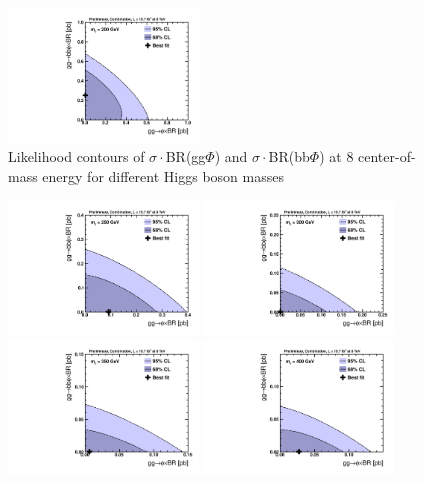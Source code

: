 \begin{figure}[!h]
\begin{center}
 \includegraphics[width=0.45\textwidth]{MSSM/PLOTS/cmb-ggH-bbH-scan-GGH-BBH-200.pdf}
 \caption{Likelihood contours of $\sigma\cdot$BR(gg$\Phi$) and $\sigma\cdot$BR(bb$\Phi$) at 8 \TeV center-of-mass energy for different Higgs boson masses}
  \label{fig:contour2}\end{center}\end{figure}


\begin{figure}[!h]\begin{center}
 \includegraphics[width=0.45\textwidth]{MSSM/PLOTS/cmb-ggH-bbH-scan-GGH-BBH-250.pdf}
 \includegraphics[width=0.45\textwidth]{MSSM/PLOTS/cmb-ggH-bbH-scan-GGH-BBH-300.pdf}
 \includegraphics[width=0.45\textwidth]{MSSM/PLOTS/cmb-ggH-bbH-scan-GGH-BBH-350.pdf}
 \includegraphics[width=0.45\textwidth]{MSSM/PLOTS/cmb-ggH-bbH-scan-GGH-BBH-400.pdf}

\end{center}
\end{figure}
